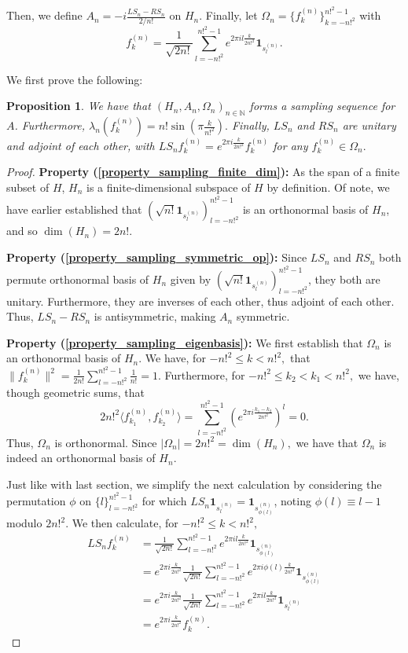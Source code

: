 \documentclass{amsart}
\newtheorem{prop}[thm]{Proposition}
\theoremstyle{definition}
\theoremstyle{remark}
\def \LL{\langle}
\def \RR{\rangle}
\begin{document}
Then, we define $A_n=-i\frac{LS_n-RS_n}{2/n!}$ on $H_n$. Finally, let $\Omega_n=\{f_k^{(n)}\}_{k=-n!^2}^{n!^2-1}$ with $$f_k^{(n)}=\frac{1}{\sqrt{2n!}}\sum_{l=-n!^2}^{n!^2-1}e^{2\pi i l\frac{k}{2n!^2}}\mathbf{1}_{s_l^{(n)}}.$$

We first prove the following:
\begin{prop}
	We have that $(H_n,A_n,\Omega_n)_{n\in\mathbb{N}}$ forms a sampling sequence for $A$. Furthermore, $\lambda_n(f_k^{(n)})=n!\sin\left(\pi\frac{k}{n!^2}\right).$ Finally, $LS_n$ and $RS_n$ are unitary and adjoint of each other, with $LS_n f_k^{(n)}=e^{2\pi i \frac{k}{2n!^2}}f_k^{(n)}$ for any $f_k^{(n)}\in\Omega_n.$
\end{prop} 
\begin{proof}
		\textbf{Property (\ref{property_sampling_finite_dim}):} As the span of a finite subset of $H$, $H_n$ is a finite-dimensional subspace of $H$ by definition. Of note, we have earlier established that $(\sqrt{n!}\mathbf{1}_{s_{l}^{(n)}})_{l=-n!^2}^{n!^2-1}$ is an orthonormal basis of $H_n$, and so $\dim(H_n)=2n!$.
	
	\textbf{Property (\ref{property_sampling_symmetric_op}):} Since $LS_n$ and $RS_n$ both permute orthonormal basis of $H_n$ given by  $(\sqrt{n!}\mathbf{1}_{s_{l}^{(n)}})_{l=-n!^2}^{n!^2-1}$, they both are unitary. Furthermore, they are inverses of each other, thus adjoint of each other. Thus, $LS_n-RS_n$ is antisymmetric, making $A_n$ symmetric.
	
	\textbf{Property (\ref{property_sampling_eigenbasis}):} We first establish that $\Omega_n$ is an orthonormal basis of $H_n$. We have, for $-n!^2\leq k <n!^2,$ that $\|f_k^{(n)}\|^2=\frac{1}{2n!}\sum_{l=-n!^2}^{n!^2-1}\frac{1}{n!}=1.$ Furthermore, for  $-n!^2\leq k_2<k_1 <n!^2,$ we have, though geometric sums, that $$2n!^2\LL f_{k_1}^{(n)},f_{k_2}^{(n)}\RR=\sum_{l=-n!^2}^{n!^2-1}\left(e^{2\pi i\frac{k_1-k_2}{2n!^2}}\right)^l=0. $$ Thus, $\Omega_n$ is orthonormal. Since $|\Omega_n|=2n!^2=\dim(H_n),$ we have that $\Omega_n$ is indeed an orthonormal basis of $H_n$.
	
	Just like with last section, we simplify the next calculation by considering the permutation  $\phi$ on $\{l\}_{l=-n!^2}^{n!^2-1}$ for which $LS_n \mathbf{1}_{s_l^{(n)}}=\mathbf{1}_{s_{\phi(l)}^{(n)}}$, noting $\phi(l)\equiv l-1$ modulo $2n!^2$. We then calculate, for $-n!^2\leq k <n!^2,$
	\begin{align*}
		LS_n f_k^{(n)}&=\frac{1}{\sqrt{2n!}}\sum_{l=-n!^2}^{n!^2-1}e^{2\pi i l\frac{k}{2n!^2}}\mathbf{1}_{s_{\phi(l)}^{(n)}}\\
		&=e^{2\pi i\frac{k}{2n!^2}}\frac{1}{\sqrt{2n!}}\sum_{l=-n!^2}^{n!^2-1}e^{2\pi i \phi(l)\frac{k}{2n!^2}}\mathbf{1}_{s_{\phi(l)}^{(n)}}\\
		&=e^{2\pi i\frac{k}{2n!^2}}\frac{1}{\sqrt{2n!}}\sum_{l=-n!^2}^{n!^2-1}e^{2\pi i l\frac{k}{2n!^2}}\mathbf{1}_{s_l^{(n)}}\\
		&=e^{2\pi i\frac{k}{2n!^2}} f_k^{(n)}.
	\end{align*}
	

\end{proof}
\end{document}
